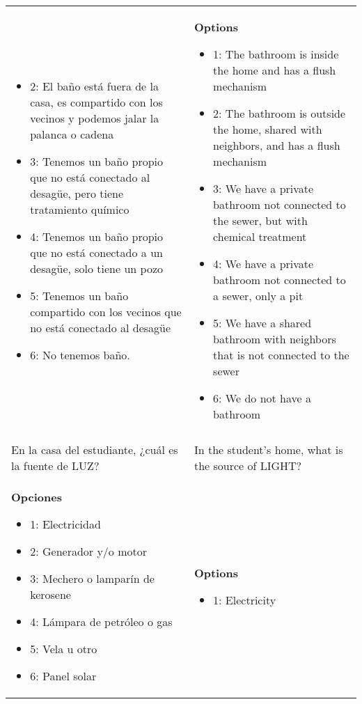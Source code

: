 \documentclass[11pt]{article}
\begin{document}
\begin{longtable}{@{}LL@{}}
\begin{itemize}[leftmargin=*]
\item 2: El baño está fuera de la casa, es compartido con los vecinos y podemos jalar la palanca o cadena
\item 3: Tenemos un baño propio que no está conectado al desagüe, pero tiene tratamiento químico
\item 4: Tenemos un baño propio que no está conectado a un desagüe, solo tiene un pozo
\item 5: Tenemos un baño compartido con los vecinos que no está conectado al desagüe
\item 6: No tenemos baño.\end{itemize} & \textbf{Options}\par\begin{itemize}[leftmargin=*]\item 1: The bathroom is inside the home and has a flush mechanism
\item 2: The bathroom is outside the home, shared with neighbors, and has a flush mechanism
\item 3: We have a private bathroom not connected to the sewer, but with chemical treatment
\item 4: We have a private bathroom not connected to a sewer, only a pit
\item 5: We have a shared bathroom with neighbors that is not connected to the sewer
\item 6: We do not have a bathroom\end{itemize} \\
\addlinespace[4pt]
 \\ 
En la casa del estudiante, ¿cuál es la fuente de LUZ? & In the student's home, what is the source of LIGHT? \\
\textbf{Opciones}\par\begin{itemize}[leftmargin=*]\item 1: Electricidad
\item 2: Generador y/o motor
\item 3: Mechero o lamparín de kerosene
\item 4: Lámpara de petróleo o gas
\item 5: Vela u otro
\item 6: Panel solar\end{itemize} & \textbf{Options}\par\begin{itemize}[leftmargin=*]\item 1: Electricity

\end{itemize}
\end{longtable}
\end{document}
